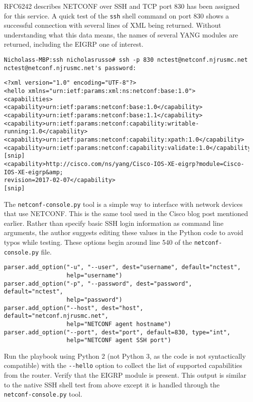 RFC6242 describes NETCONF over SSH and TCP port 830 has been assigned for this
service. A quick test of the \verb|ssh| shell command on port 830 shows a
successful connection with several lines of XML being returned. Without
understanding what this data means, the names of several YANG modules are
returned, including the EIGRP one of interest.

\begin{verbatim}
Nicholass-MBP:ssh nicholasrusso# ssh -p 830 nctest@netconf.njrusmc.net
nctest@netconf.njrusmc.net's password:
\end{verbatim}

\begin{verbatim}
<?xml version="1.0" encoding="UTF-8"?>
<hello xmlns="urn:ietf:params:xml:ns:netconf:base:1.0">
<capabilities>
<capability>urn:ietf:params:netconf:base:1.0</capability>
<capability>urn:ietf:params:netconf:base:1.1</capability>
<capability>urn:ietf:params:netconf:capability:writable-running:1.0</capability>
<capability>urn:ietf:params:netconf:capability:xpath:1.0</capability>
<capability>urn:ietf:params:netconf:capability:validate:1.0</capability>
[snip]
<capability>http://cisco.com/ns/yang/Cisco-IOS-XE-eigrp?module=Cisco-IOS-XE-eigrp&amp;
revision=2017-02-07</capability>
[snip]
\end{verbatim}

The \verb|netconf-console.py| tool is a simple way to interface with network
devices that use NETCONF\@. This is the same tool used in the Cisco blog post
mentioned earlier. Rather than specify basic SSH login information as command
line arguments, the author suggests editing these values in the Python code to
avoid typos while testing. These options begin around line 540 of the
\verb|netconf-console.py| file.

\begin{verbatim}
parser.add_option("-u", "--user", dest="username", default="nctest",
                  help="username")
parser.add_option("-p", "--password", dest="password", default="nctest",
                  help="password")
parser.add_option("--host", dest="host", default="netconf.njrusmc.net",
                  help="NETCONF agent hostname")
parser.add_option("--port", dest="port", default=830, type="int",
                  help="NETCONF agent SSH port")
\end{verbatim}

Run the playbook using Python 2 (not Python 3, as the code is not
syntactically compatible) with the \verb|--hello| option to collect the list of
supported capabilities from the router. Verify that the EIGRP module is
present. This output is similar to the native SSH shell test from above except
it is handled through the \verb|netconf-console.py| tool.

